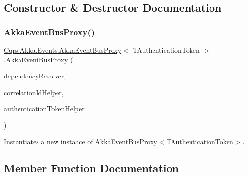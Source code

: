 \subsection{Constructor \& Destructor Documentation}
\mbox{\label{classCqrs_1_1Akka_1_1Events_1_1AkkaEventBusProxy_a2f886b4e9e64188fe69478c39c96f2b5_a2f886b4e9e64188fe69478c39c96f2b5}} 
\subsubsection{\texorpdfstring{Akka\+Event\+Bus\+Proxy()}{AkkaEventBusProxy()}}
{\footnotesize\ttfamily \hyperlink{classCqrs_1_1Akka_1_1Events_1_1AkkaEventBusProxy}{Cqrs.\+Akka.\+Events.\+Akka\+Event\+Bus\+Proxy}$<$ T\+Authentication\+Token $>$.\hyperlink{classCqrs_1_1Akka_1_1Events_1_1AkkaEventBusProxy}{Akka\+Event\+Bus\+Proxy} (\begin{DoxyParamCaption}\item[{\hyperlink{interfaceCqrs_1_1Configuration_1_1IDependencyResolver}{I\+Dependency\+Resolver}}]{dependency\+Resolver,  }\item[{I\+Correlation\+Id\+Helper}]{correlation\+Id\+Helper,  }\item[{\hyperlink{interfaceCqrs_1_1Authentication_1_1IAuthenticationTokenHelper}{I\+Authentication\+Token\+Helper}$<$ T\+Authentication\+Token $>$}]{authentication\+Token\+Helper }\end{DoxyParamCaption})}



Instantiates a new instance of \hyperlink{classCqrs_1_1Akka_1_1Events_1_1AkkaEventBusProxy_a2f886b4e9e64188fe69478c39c96f2b5_a2f886b4e9e64188fe69478c39c96f2b5}{Akka\+Event\+Bus\+Proxy$<$\+T\+Authentication\+Token$>$}. 



\subsection{Member Function Documentation}
\mbox{\label{classCqrs_1_1Akka_1_1Events_1_1AkkaEventBusProxy_a656daead2fe6f30487855dbaea5a3c83_a656daead2fe6f30487855dbaea5a3c83}} 
